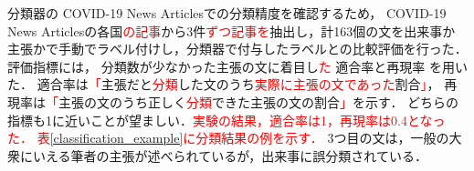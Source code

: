 \documentclass[a4paper, twocolumn, 10pt]{jarticle}
\begin{document}
分類器の
COVID-19 News Articlesでの分類精度を確認するため，
COVID-19 News Articlesの各国\textcolor{red}{の記事}から3件\textcolor{red}{ずつ記事を}抽出し，計163個の文を出来事か主張かで手動でラベル付けし，分類器で付与したラベルとの比較評価を行った．
評価指標には，
分類数が少なかった主張の文に着目し\textcolor{red}{た}
適合率と再現率
を用いた．
適合率は\textcolor{red}{「}主張だと\textcolor{red}{分類}した文のうち\textcolor{red}{実際に主張の文であった}割合\textcolor{red}{」}，
再現率は\textcolor{red}{「}主張の文のうち正しく\textcolor{red}{分類}できた主張の文の割合\textcolor{red}{」}を示す．
どちらの指標も1に近いことが望ましい．\textcolor{red}{実験の結果，適合率は1，再現率は0.4となった．}
\textcolor{red}{表\ref{classification_example}に分類結果の例を示す．}
3つ目の文は，一般の大衆にいえる筆者の主張が述べられているが，出来事に誤分類されている．
\end{document}
